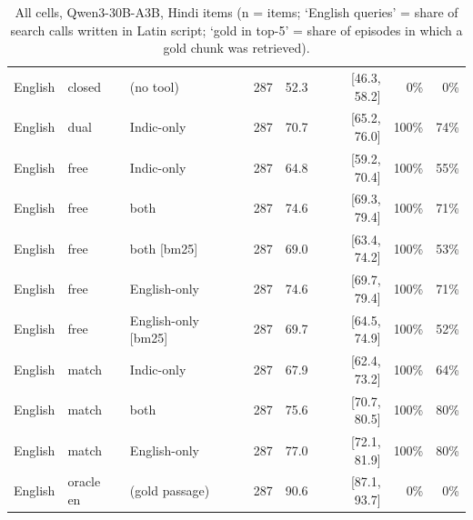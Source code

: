 \begin{table}[htbp]
\begin{tabular}{lllrrrrr}
English & closed & (no tool) & 287 & 52.3 & [46.3, 58.2] & 0\% & 0\% \\
English & dual & Indic-only & 287 & 70.7 & [65.2, 76.0] & 100\% & 74\% \\
English & free & Indic-only & 287 & 64.8 & [59.2, 70.4] & 100\% & 55\% \\
English & free & both & 287 & 74.6 & [69.3, 79.4] & 100\% & 71\% \\
English & free & both [bm25] & 287 & 69.0 & [63.4, 74.2] & 100\% & 53\% \\
English & free & English-only & 287 & 74.6 & [69.7, 79.4] & 100\% & 71\% \\
English & free & English-only [bm25] & 287 & 69.7 & [64.5, 74.9] & 100\% & 52\% \\
English & match & Indic-only & 287 & 67.9 & [62.4, 73.2] & 100\% & 64\% \\
English & match & both & 287 & 75.6 & [70.7, 80.5] & 100\% & 80\% \\
English & match & English-only & 287 & 77.0 & [72.1, 81.9] & 100\% & 80\% \\
English & oracle en & (gold passage) & 287 & 90.6 & [87.1, 93.7] & 0\% & 0\% \\
\bottomrule
\end{tabular}
\caption{All cells, Qwen3-30B-A3B, Hindi items (n = items; `English queries' = share of search calls written in Latin script; `gold in top-5' = share of episodes in which a gold chunk was retrieved).}
\end{table}

